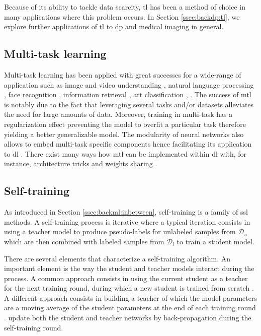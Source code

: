 Because of its ability to tackle data scarcity, \acrlong{tl} has been a method of
choice in many applications where this problem occurs. In Section \ref{ssec:backdp:tl},
we explore further applications of \acrlong{tl} to \acrlong{dp} and medical imaging
in general.

\subsection{Multi-task learning}
\label{ssec:backml:dl:deepmultitask}

Multi-task learning \cite{zhang2017survey} has been applied with great successes for a wide-range of application such as image and video understanding \cite{kokkinos2017ubernet}, natural language processing \cite{collobert2008unified}, face recognition \cite{zhu2012face, chen2014joint, zhang2014facial, ranjan2017hyperface}, information retrieval \cite{liu2015representation}, art classification \cite{strezoski2017omniart}, \etc. The success of \acrlong{mtl} is notably due to the fact that leveraging several tasks and/or datasets alleviates the need for large amounts of data. Moreover, training in multi-task has a regularization effect preventing the model to overfit a particular task therefore yielding a better generalizable model. The modularity of neural networks also allows to embed multi-task specific components hence facilitating its application to \acrlong{dl} \cite{caruana1997multitask, zhang2017survey}. There exist many ways how \acrlong{mtl} can be implemented within \acrlong{dl} with, for instance, architecture tricks \cite{misra2016cross, strezoski2019many} and weights sharing \cite{caruana1997multitask}.

\subsection{Self-training}
\label{ssec:backml:dl:selftraining}

As introduced in Section \ref{ssec:backml:inbetween}, self-training is a family of \acrlong{ssl} methods. A self-training process is iterative where a typical iteration consists in using a teacher model to produce pseudo-labels for unlabeled samples from $\mathcal{D}_u$ which are then combined with labeled samples from $\mathcal{D}_l$ to train a student model. 

There are several elements that characterize a self-training algorithm. An important element is the way the student and teacher models interact during the process. A common approach consists in using the current student as a teacher for the next training round, during which a new student is trained from scratch \cite{yarowsky1995unsupervised, xie2020self}. A different approach consists in building a teacher of which the model parameters are a moving average of the student parameters at the end of each training round \cite{tarvainen2017mean}. \citeauthor{pham2021meta} \cite{pham2021meta} update both the student and teacher networks by back-propagation during the self-training round. 

